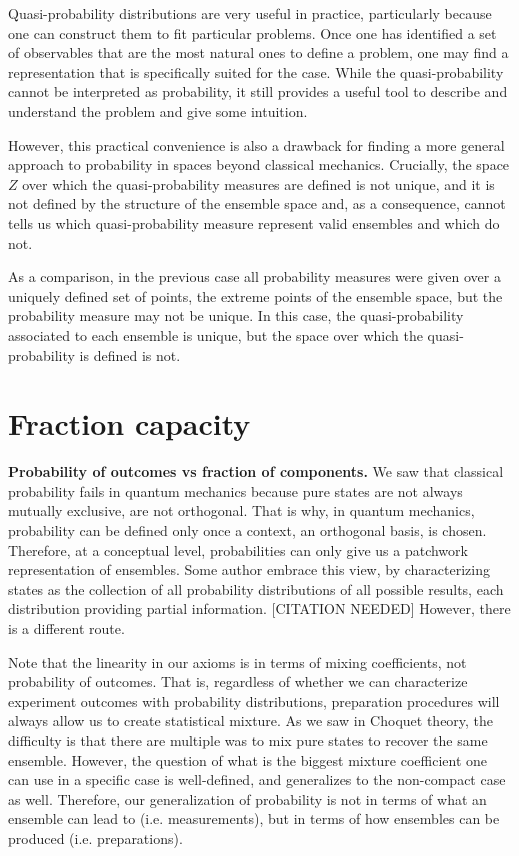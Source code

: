 \documentclass[10pt,twocolumn, nofootinbib]{revtex4-2}
\begin{document}
Quasi-probability distributions are very useful in practice, particularly because one can construct them to fit particular problems. Once one has identified a set of observables that are the most natural ones to define a problem, one may find a representation that is specifically suited for the case. While the quasi-probability cannot be interpreted as probability, it still provides a useful tool to describe and understand the problem and give some intuition.

However, this practical convenience is also a drawback for finding a more general approach to probability in spaces beyond classical mechanics. Crucially, the space $Z$ over which the quasi-probability measures are defined is not unique, and it is not defined by the structure of the ensemble space and, as a consequence, cannot tells us which quasi-probability measure represent valid ensembles and which do not.

As a comparison, in the previous case all probability measures were given over a uniquely defined set of points, the extreme points of the ensemble space, but the probability measure may not be unique. In this case, the quasi-probability associated to each ensemble is unique, but the space over which the quasi-probability is defined is not.

\section{Fraction capacity}

\textbf{Probability of outcomes vs fraction of components.} We saw that classical probability fails in quantum mechanics because pure states are not always mutually exclusive, are not orthogonal. That is why, in quantum mechanics, probability can be defined only once a context, an orthogonal basis, is chosen. Therefore, at a conceptual level, probabilities can only give us a patchwork representation of ensembles. Some author embrace this view, by characterizing states as the collection of all probability distributions of all possible results, each distribution providing partial information. [CITATION NEEDED] However, there is a different route.

Note that the linearity in our axioms is in terms of mixing coefficients, not probability of outcomes. That is, regardless of whether we can characterize experiment outcomes with probability distributions, preparation procedures will always allow us to create statistical mixture. As we saw in Choquet theory, the difficulty is that there are multiple was to mix pure states to recover the same ensemble. However, the question of what is the biggest mixture coefficient one can use in a specific case is well-defined, and generalizes to the non-compact case as well. Therefore, our generalization of probability is not in terms of what an ensemble can lead to (i.e. measurements), but in terms of how ensembles can be produced (i.e. preparations).
\end{document}
